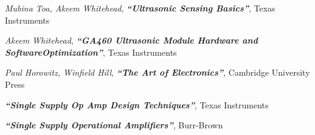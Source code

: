 \documentclass[12pt, a4paper]{article}
\begin{document}
    


    \begin{thebibliography}{}	
        
        \bibitem{}
        \textit{Mubina Toa, Akeem Whitehead}, \textbf{\textit{``Ultrasonic Sensing Basics''}}, Texas Instruments

        \bibitem{}
        \textit{Akeem Whitehead}, \textbf{\textit{``GA460 Ultrasonic Module Hardware and SoftwareOptimization''}}, Texas Instruments

        \bibitem{}
        \textit{Paul Horowitz, Winfield Hill}, \textbf{\textit{``The Art of Electronics''}}, Cambridge University Press

        \bibitem{}
        \textbf{\textit{``Single Supply Op Amp Design Techniques''}}, Texas Instruments
        
        \bibitem{}
        \textbf{\textit{``Single Supply Operational Amplifiers''}}, Burr-Brown


    \end{thebibliography}
            
\end{document}
